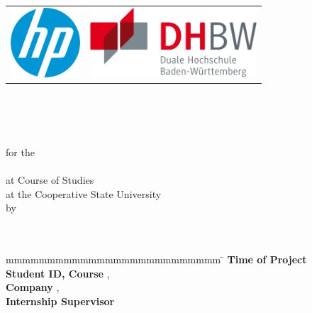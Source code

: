 \begin{titlepage}
    \pagestyle{plain}
	\begin{longtable}{p{} p{}}
	  {\includegraphics[height=2.6cm]{./images/HP_Logo.png}} & 
	  {\includegraphics[height=2.6cm]{./images/DHBW_Logo.png}}
	\end{longtable}
	\enlargethispage{20mm}
	\begin{center}
	    \begin{spacing}{1.5}
	      \vspace*{5mm}	{\LARGE\bf \titel }\\
	      \vspace*{3mm}{\large \subtitel }\\
	    \end{spacing}
	 \end{center}
	 \begin{center}
	    \vspace*{5mm}	{\large\bf \arbeit}\\
        \vspace*{9mm}	for the\\
	    \vspace*{3mm} 	{\bf \abschluss}\\
	    \vspace*{12mm}	at Course of Studies \studiengang\\
	    \vspace*{1mm} 	at the Cooperative State University \dhbw\\
	    \vspace*{12mm}	by\\
	    \vspace*{3mm} 	{\large\bf \autor}\\
	    \vspace*{12mm}	\datumAbgabe\\
	\end{center}
	\vfill
	\begin{spacing}{1.2}
	    \begin{tabbing}
		    mmmmmmmmmmmmmmmmmmmmmmmmmm     \= \kill
		    \textbf{Time of Project}  \>  \zeitraum\\
		    \textbf{Student ID, Course}  \>  \matrikelnr, \kurs\\
		    \textbf{Company}      \>  \firma, \firmenort\\
		    \textbf{Internship Supervisor}              \>  \betreuer
	    \end{tabbing}
	\end{spacing}
\end{titlepage}
